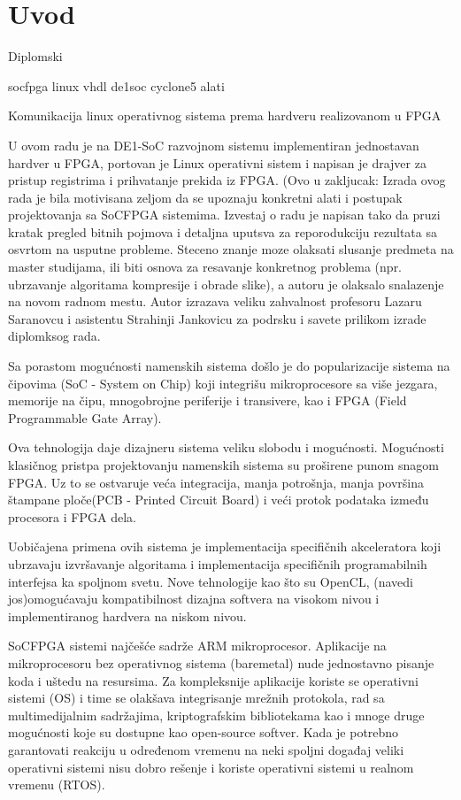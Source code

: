 \section{Uvod}

Diplomski

socfpga
linux
vhdl
de1soc
cyclone5
alati

Komunikacija linux operativnog sistema prema hardveru realizovanom u FPGA

U ovom radu je na DE1-SoC razvojnom sistemu implementiran jednostavan hardver u FPGA, portovan je Linux operativni sistem i napisan je drajver za pristup registrima i prihvatanje prekida iz FPGA. (Ovo u zakljucak: Izrada ovog rada je bila motivisana zeljom da se upoznaju konkretni alati i postupak projektovanja sa SoCFPGA sistemima. Izvestaj o radu je napisan tako da pruzi kratak pregled bitnih pojmova i detaljna uputsva za reporodukciju rezultata sa osvrtom na usputne probleme. Steceno znanje moze olaksati slusanje predmeta na master studijama, ili biti osnova za resavanje konkretnog problema (npr. ubrzavanje algoritama kompresije i obrade slike), a autoru je olaksalo snalazenje na novom radnom mestu. Autor izrazava veliku zahvalnost profesoru Lazaru Saranovcu i asistentu Strahinji Jankovicu za podrsku i savete prilikom izrade diplomksog rada.

Sa porastom mogućnosti namenskih sistema došlo je do popularizacije sistema na čipovima (SoC - System on Chip) koji integrišu mikroprocesore sa više jezgara, memorije na čipu, mnogobrojne periferije i transivere, kao i FPGA (Field Programmable Gate Array).

Ova tehnologija daje dizajneru sistema veliku slobodu i mogućnosti. Mogućnosti klasičnog pristpa projektovanju namenskih sistema su proširene punom snagom FPGA. Uz to se ostvaruje veća integracija, manja potrošnja, manja površina štampane ploče(PCB - Printed Circuit Board) i veći protok podataka između procesora i FPGA dela. 

Uobičajena primena ovih sistema je implementacija specifičnih akceleratora koji ubrzavaju izvršavanje algoritama i implementacija specifičnih programabilnih interfejsa ka spoljnom svetu. Nove tehnologije kao što su OpenCL, (navedi jos)omogućavaju kompatibilnost dizajna softvera na visokom nivou i implementiranog hardvera na niskom nivou.

SoCFPGA sistemi najčešće sadrže ARM mikroprocesor. Aplikacije na mikroprocesoru bez operativnog sistema (baremetal) nude jednostavno pisanje koda i uštedu na resursima. Za kompleksnije aplikacije koriste se operativni sistemi (OS) i time se olakšava integrisanje mrežnih protokola, rad sa multimedijalnim sadržajima, kriptografskim bibliotekama kao i mnoge druge mogućnosti koje su dostupne kao open-source softver. Kada je potrebno garantovati reakciju u određenom vremenu na neki spoljni događaj veliki operativni sistemi nisu dobro rešenje i koriste operativni sistemi u realnom vremenu (RTOS).

